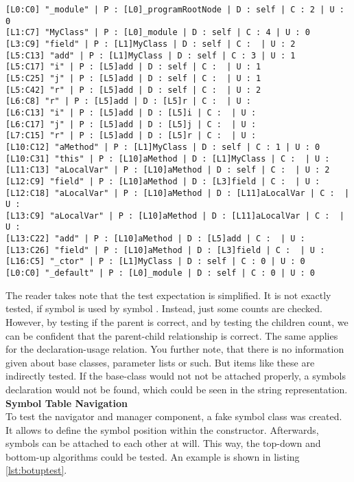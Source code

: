 \begin{verbatim}
[L0:C0] "_module" | P : [L0]_programRootNode | D : self | C : 2 | U : 0
[L1:C7] "MyClass" | P : [L0]_module | D : self | C : 4 | U : 0
[L3:C9] "field" | P : [L1]MyClass | D : self | C :  | U : 2
[L5:C13] "add" | P : [L1]MyClass | D : self | C : 3 | U : 1
[L5:C17] "i" | P : [L5]add | D : self | C :  | U : 1
[L5:C25] "j" | P : [L5]add | D : self | C :  | U : 1
[L5:C42] "r" | P : [L5]add | D : self | C :  | U : 2
[L6:C8] "r" | P : [L5]add | D : [L5]r | C :  | U :
[L6:C13] "i" | P : [L5]add | D : [L5]i | C :  | U :
[L6:C17] "j" | P : [L5]add | D : [L5]j | C :  | U :
[L7:C15] "r" | P : [L5]add | D : [L5]r | C :  | U :
[L10:C12] "aMethod" | P : [L1]MyClass | D : self | C : 1 | U : 0
[L10:C31] "this" | P : [L10]aMethod | D : [L1]MyClass | C :  | U :
[L11:C13] "aLocalVar" | P : [L10]aMethod | D : self | C :  | U : 2
[L12:C9] "field" | P : [L10]aMethod | D : [L3]field | C :  | U :
[L12:C18] "aLocalVar" | P : [L10]aMethod | D : [L11]aLocalVar | C :  | U :
[L13:C9] "aLocalVar" | P : [L10]aMethod | D : [L11]aLocalVar | C :  | U :
[L13:C22] "add" | P : [L10]aMethod | D : [L5]add | C :  | U :
[L13:C26] "field" | P : [L10]aMethod | D : [L3]field | C :  | U :
[L16:C5] "_ctor" | P : [L1]MyClass | D : self | C : 0 | U : 0
[L0:C0] "_default" | P : [L0]_module | D : self | C : 0 | U : 0
\end{verbatim}

The reader takes note that the test expectation is simplified.
It is not exactly tested, if symbol  is used by symbol .
Instead, just some counts are checked.
However, by testing if the parent is correct, and by testing the children count, we can be confident that the parent-child relationship is correct.
The same applies for the declaration-usage relation.
You further note, that there is no information given about base classes, parameter lists or such.
But items like these are indirectly tested.
If the base-class would not not be attached properly,
a symbols declaration would not be found, which could be seen in the string representation.\\

\textbf{Symbol Table Navigation}\\
To test the navigator and manager component, a fake symbol class was created.
It allows to define the symbol position within the constructor.
Afterwards, symbols can be attached to each other at will.
This way, the top-down and bottom-up algorithms could be tested.
An example is shown in listing \ref{lst:botuptest}.

